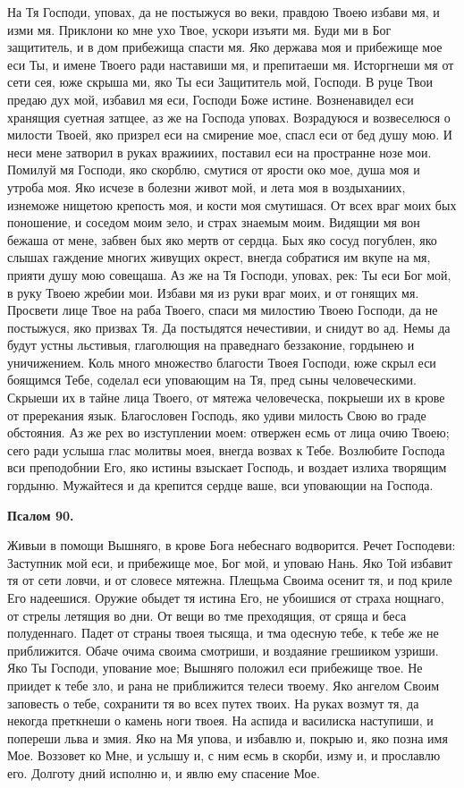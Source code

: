 На Тя Господи, уповах, да не постыжуся во веки, правдою Твоею избави мя, и изми мя. Приклони ко мне ухо Твое, ускори изъяти мя. Буди ми в Бог защититель, и в дом прибежища спасти мя. Яко держава моя и прибежище мое еси Ты, и имене Твоего ради наставиши мя, и препитаеши мя. Исторгнеши мя от сети сея, юже скрыша ми, яко Ты еси Защититель мой, Господи. В руце Твои предаю дух мой, избавил мя еси, Господи Боже истине. Возненавидел еси хранящия суетная затщее, аз же на Господа уповах. Возрадуюся и возвеселюся о милости Твоей, яко призрел еси на смирение мое, спасл еси от бед душу мою. И неси мене затворил в руках вражииих, поставил еси на пространне нозе мои. Помилуй мя Господи, яко скорблю, смутися от ярости око мое, душа моя и утроба моя. Яко исчезе в болезни живот мой, и лета моя в воздыханиих, изнеможе нищетою крепость моя, и кости моя смутишася. От всех враг моих бых поношение, и соседом моим зело, и страх знаемым моим. Видящии мя вон бежаша от мене, забвен бых яко мертв от сердца. Бых яко сосуд погублен, яко слышах гаждение многих живущих окрест, внегда собратися им вкупе на мя, прияти душу мою совещаша. Аз же на Тя Господи, уповах, рек: Ты еси Бог мой, в руку Твоею жребии мои. Избави мя из руки враг моих, и от гонящих мя. Просвети лице Твое на раба Твоего, спаси мя милостию Твоею Господи, да не постыжуся, яко призвах Тя. Да постыдятся нечестивии, и снидут во ад. Немы да будут устны льстивыя, глаголющия на праведнаго беззаконие, гордынею и уничижением. Коль много множество благости Твоея Господи, юже скрыл еси боящимся Тебе, соделал еси уповающим на Тя, пред сыны человеческими. Скрыеши их в тайне лица Твоего, от мятежа человеческа, покрыеши их в крове от пререкания язык. Благословен Господь, яко удиви милость Свою во граде обстояния. Аз же рех во изступлении моем: отвержен есмь от лица очию Твоею; сего ради услыша глас молитвы моея, внегда возвах к Тебе. Возлюбите Господа вси преподобнии Его, яко истины взыскает Господь, и воздает излиха творящим гордыню. Мужайтеся и да крепится сердце ваше, вси уповающии на Господа.


\medskip


\bfseries Псалом 90.\normalfont{}\nopagebreak


Живыи в помощи Вышняго, в крове Бога небеснаго водворится. Речет Господеви: Заступник мой еси, и прибежище мое, Бог мой, и уповаю Нань. Яко Той избавит тя от сети ловчи, и от словесе мятежна. Плещьма Своима осенит тя, и под криле Его надеешися. Оружие обыдет тя истина Его, не убоишися от страха нощнаго, от стрелы летящия во дни. От вещи во тме преходящия, от сряща и беса полуденнаго. Падет от страны твоея тысяща, и тма одесную тебе, к тебе же не приближится. Обаче очима своима смотриши, и воздаяние грешииком узриши. Яко Ты Господи, упование  мое; Вышняго положил еси прибежище твое. Не приидет к тебе зло, и рана не приближится телеси твоему. Яко ангелом Своим заповесть о тебе, сохранити тя во всех путех твоих. На руках возмут тя, да некогда преткнеши о камень ноги твоея. На аспида и василиска наступиши, и попереши льва и змия. Яко на Мя упова, и избавлю и, покрыю и, яко позна имя Мое. Воззовет ко Мне, и услышу и, с ним есмь в скорби, изму и, и прославлю его. Долготу дний исполню и, и явлю ему спасение Мое.


